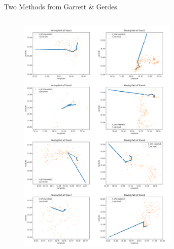 \documentclass[aspectratio=169, 8pt]{beamer}
\begin{document}
\begin{frame}{Two Methods from Garrett \& Gerdes}
\begin{columns}[T]
    \begin{column}{0.45\linewidth}
        \begin{figure}
                \centering
                \includegraphics[width = 0.7\textwidth]{images/Garrett_moving_path.png}
                \label{fig:enter-label}
        \end{figure}
    \end{column}
\end{columns}

\end{frame}

\end{document}
